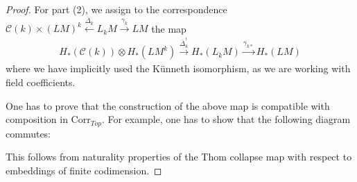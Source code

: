 \documentclass{scrartcl}
\theoremstyle{plain}
\theoremstyle{definition}
\newcommand{\comp}{\circ}
\begin{document}
\begin{proof}
    For part (2), we assign to the correspondence $\mathcal C(k) \times {(LM)}^k \xleftarrow{\overline\Delta_k} L_k M \xrightarrow{\gamma_k} LM$ the map 
    \begin{align*}
        H_*(\mathcal C(k)) \otimes H_*(LM^k) \xrightarrow{\overline \Delta_{k}^!} H_*(L_kM) \xrightarrow{\gamma_{k*}} H_*(LM)
    \end{align*}
    where we have implicitly used the Künneth isomorphism, as we are working with field coefficients. 

    One has to prove that the construction of the above map is compatible with composition in $\mathrm{Corr}_{Top}$. For example, one has to show that the following diagram commutes:
    \begin{center}
    \end{center}
    This follows from naturality properties of the Thom collapse map with respect to embeddings of finite codimension. 
\end{proof}

\nocite{*}

\end{document}
